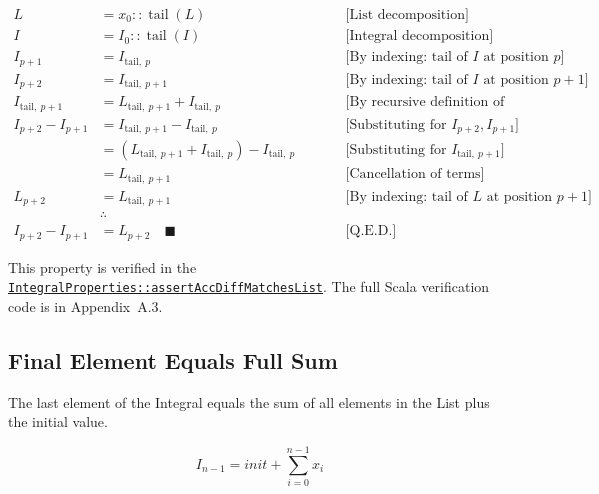 \begin{equation*}
\begin{aligned}
L &= x_0 :: \operatorname{tail}(L)
  & \qquad &\text{[List decomposition]} \\
I &= I_0 :: \operatorname{tail}(I)
  & \qquad &\text{[Integral decomposition]} \\
I_{p+1} &= I_{\text{tail},\ p}
  & \qquad &\text{[By indexing: tail of } I \text{ at position } p] \\
I_{p+2} &= I_{\text{tail},\ p+1}
  & \qquad &\text{[By indexing: tail of } I \text{ at position } p + 1] \\
I_{\text{tail},\ p+1} &= L_{\text{tail},\ p+1} + I_{\text{tail},\ p}
  & \qquad &\text{[By recursive definition of Integral]} \\
I_{p+2} - I_{p+1} &= I_{\text{tail},\ p+1} - I_{\text{tail},\ p}
  & \qquad &\text{[Substituting for } I_{p+2}, I_{p+1}] \\
                   &= (L_{\text{tail},\ p+1} + I_{\text{tail},\ p}) - I_{\text{tail},\ p}
  & \qquad &\text{[Substituting for } I_{\text{tail},\ p+1}] \\
                   &= L_{\text{tail},\ p+1}
  & \qquad &\text{[Cancellation of terms]} \\
L_{p+2} &= L_{\text{tail},\ p+1}
  & \qquad &\text{[By indexing: tail of } L \text{ at position } p + 1] \\
& \therefore \\
I_{p+2} - I_{p+1} &= L_{p+2} \quad \blacksquare
  & \qquad &\text{[Q.E.D.]}
\end{aligned}
\end{equation*}

{\raggedright
This property is verified in the
\href{https://github.com/thiagomata/prime-numbers/blob/master/src/main/scala/v1/chapter3/list/integral/properties/IntegralProperties.scala}{\texttt{IntegralProperties::\allowbreak assertAccDiffMatchesList}}.
The full Scala verification code is in Appendix~A.3.
\par}

\subsection{Final Element Equals Full Sum}
\label{sec:final-element}

The last element of the Integral equals the sum of all elements in the
List plus the initial value.

\begin{equation*}
I_{n-1} = init + \sum_{i=0}^{n-1} x_i
\end{equation*}

